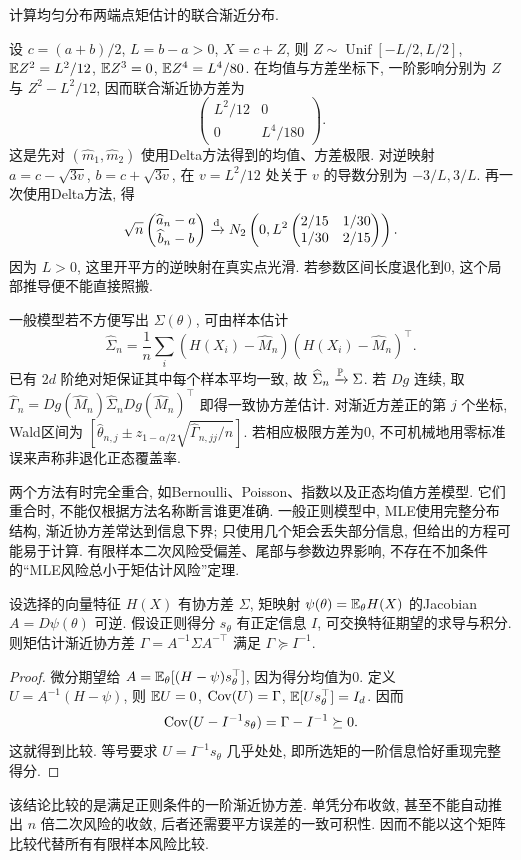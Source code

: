 \begin{example}
计算均匀分布两端点矩估计的联合渐近分布.
\end{example}
\begin{solution}
设 $c=(a+b)/2$, $L=b-a>0$, $X=c+Z$, 则 $Z\sim\operatorname{Unif}[-L/2,L/2]$, $\mathbb E Z^2=L^2/12$, $\mathbb E Z^3=0$, $\mathbb E Z^4=L^4/80$. 在均值与方差坐标下, 一阶影响分别为 $Z$ 与 $Z^2-L^2/12$, 因而联合渐近协方差为
\[
 \begin{pmatrix}L^2/12&0\\0&L^4/180\end{pmatrix}.
\]
这是先对 $(\widehat m_1,\widehat m_2)$ 使用Delta方法得到的均值、方差极限. 对逆映射 $a=c-\sqrt{3v}$, $b=c+\sqrt{3v}$, 在 $v=L^2/12$ 处关于 $v$ 的导数分别为 $-3/L,3/L$. 再一次使用Delta方法, 得
\[
 \sqrt n\begin{pmatrix}\widehat a_n-a\\\widehat b_n-b\end{pmatrix}
 \xrightarrow{\mathrm d} N_2\left(0,L^2\begin{pmatrix}2/15&1/30\\1/30&2/15\end{pmatrix}\right).
\]
因为 $L>0$, 这里开平方的逆映射在真实点光滑. 若参数区间长度退化到0, 这个局部推导便不能直接照搬.
\end{solution}

一般模型若不方便写出 $\Sigma(\theta)$, 可由样本估计
\[
 \widehat\Sigma_n=\frac1n\sum_i
 (H(X_i)-\widehat M_n)(H(X_i)-\widehat M_n)^\top.
\]
已有 $2d$ 阶绝对矩保证其中每个样本平均一致, 故 $\widehat\Sigma_n\xrightarrow{\mathbb P}\Sigma$. 若 $Dg$ 连续, 取 $\widehat\Gamma_n=Dg(\widehat M_n)\widehat\Sigma_nDg(\widehat M_n)^\top$ 即得一致协方差估计. 对渐近方差正的第 $j$ 个坐标, Wald区间为 $[\widehat\theta_{n,j}\pm z_{1-\alpha/2}\sqrt{\widehat\Gamma_{n,jj}/n}]$. 若相应极限方差为0, 不可机械地用零标准误来声称非退化正态覆盖率.

两个方法有时完全重合, 如Bernoulli、Poisson、指数以及正态均值方差模型. 它们重合时, 不能仅根据方法名称断言谁更准确. 一般正则模型中, MLE使用完整分布结构, 渐近协方差常达到信息下界; 只使用几个矩会丢失部分信息, 但给出的方程可能易于计算. 有限样本二次风险受偏差、尾部与参数边界影响, 不存在不加条件的“MLE风险总小于矩估计风险”定理.

\begin{proposition}[正则矩估计的渐近信息比较]
设选择的向量特征 $H(X)$ 有协方差 $\Sigma$, 矩映射 $\psi(\theta)=\mathbb E_\theta H(X)$ 的Jacobian $A=D\psi(\theta)$ 可逆. 假设正则得分 $s_\theta$ 有正定信息 $I$, 可交换特征期望的求导与积分. 则矩估计渐近协方差 $\Gamma=A^{-1}\Sigma A^{-\top}$ 满足 $\Gamma\succeq I^{-1}$.
\end{proposition}
\begin{proof}
微分期望给 $A=\mathbb E_\theta[(H-\psi)s_\theta^\top]$, 因为得分均值为0. 定义 $U=A^{-1}(H-\psi)$, 则 $\mathbb E U=0$, $\operatorname{Cov}(U)=\Gamma$, $\mathbb E[Us_\theta^\top]=I_d$. 因而
\[
 \operatorname{Cov}(U-I^{-1}s_\theta)=\Gamma-I^{-1}\succeq0.
\]
这就得到比较. 等号要求 $U=I^{-1}s_\theta$ 几乎处处, 即所选矩的一阶信息恰好重现完整得分.
\end{proof}
该结论比较的是满足正则条件的一阶渐近协方差. 单凭分布收敛, 甚至不能自动推出 $n$ 倍二次风险的收敛, 后者还需要平方误差的一致可积性. 因而不能以这个矩阵比较代替所有有限样本风险比较.

